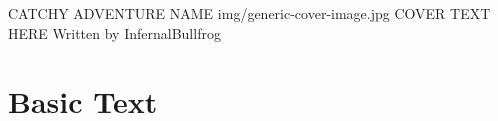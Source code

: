 \documentclass[10pt,twoside]{book}
\begin{document}
\selectfont %

\begin{titlepage}
        {\color{white} CATCHY ADVENTURE NAME} %
        {img/generic-cover-image.jpg} %
        {\color{white} COVER TEXT HERE} %
        {\color{white} Written by InfernalBullfrog} %
\end{titlepage}
\newpage \clearpage
\NoBgThispage
\thispagestyle{empty}
\mbox{}
\newpage \clearpage
\setcounter{page}{1}

\chapter{Basic Text}
\thispagestyle{fancy}
\end{document}
